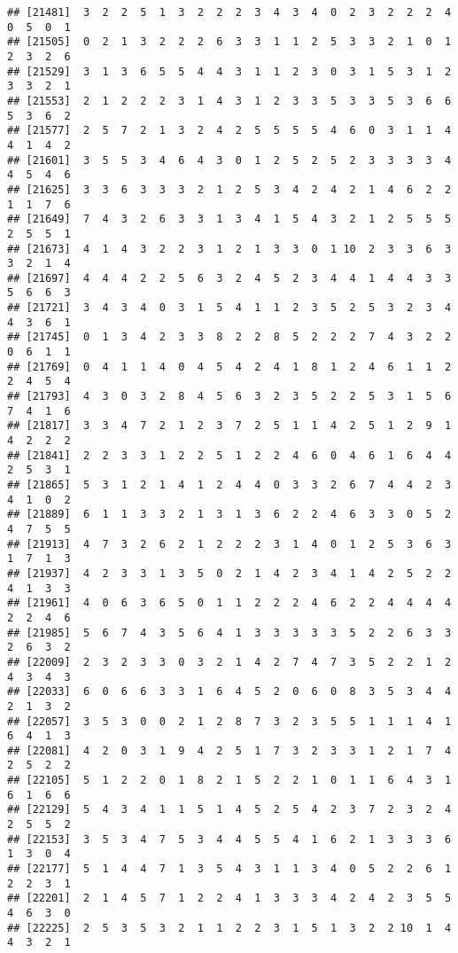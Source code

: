 \documentclass[
]{article}
\begin{document}
\begin{verbatim}
## [21481]  3  2  2  5  1  3  2  2  2  3  4  3  4  0  2  3  2  2  2  4  0  5  0  1
## [21505]  0  2  1  3  2  2  2  6  3  3  1  1  2  5  3  3  2  1  0  1  2  3  2  6
## [21529]  3  1  3  6  5  5  4  4  3  1  1  2  3  0  3  1  5  3  1  2  3  3  2  1
## [21553]  2  1  2  2  2  3  1  4  3  1  2  3  3  5  3  3  5  3  6  6  5  3  6  2
## [21577]  2  5  7  2  1  3  2  4  2  5  5  5  5  4  6  0  3  1  1  4  4  1  4  2
## [21601]  3  5  5  3  4  6  4  3  0  1  2  5  2  5  2  3  3  3  3  4  4  5  4  6
## [21625]  3  3  6  3  3  3  2  1  2  5  3  4  2  4  2  1  4  6  2  2  1  1  7  6
## [21649]  7  4  3  2  6  3  3  1  3  4  1  5  4  3  2  1  2  5  5  5  2  5  5  1
## [21673]  4  1  4  3  2  2  3  1  2  1  3  3  0  1 10  2  3  3  6  3  3  2  1  4
## [21697]  4  4  4  2  2  5  6  3  2  4  5  2  3  4  4  1  4  4  3  3  5  6  6  3
## [21721]  3  4  3  4  0  3  1  5  4  1  1  2  3  5  2  5  3  2  3  4  4  3  6  1
## [21745]  0  1  3  4  2  3  3  8  2  2  8  5  2  2  2  7  4  3  2  2  0  6  1  1
## [21769]  0  4  1  1  4  0  4  5  4  2  4  1  8  1  2  4  6  1  1  2  2  4  5  4
## [21793]  4  3  0  3  2  8  4  5  6  3  2  3  5  2  2  5  3  1  5  6  7  4  1  6
## [21817]  3  3  4  7  2  1  2  3  7  2  5  1  1  4  2  5  1  2  9  1  4  2  2  2
## [21841]  2  2  3  3  1  2  2  5  1  2  2  4  6  0  4  6  1  6  4  4  2  5  3  1
## [21865]  5  3  1  2  1  4  1  2  4  4  0  3  3  2  6  7  4  4  2  3  4  1  0  2
## [21889]  6  1  1  3  3  2  1  3  1  3  6  2  2  4  6  3  3  0  5  2  4  7  5  5
## [21913]  4  7  3  2  6  2  1  2  2  2  3  1  4  0  1  2  5  3  6  3  1  7  1  3
## [21937]  4  2  3  3  1  3  5  0  2  1  4  2  3  4  1  4  2  5  2  2  4  1  3  3
## [21961]  4  0  6  3  6  5  0  1  1  2  2  2  4  6  2  2  4  4  4  4  2  2  4  6
## [21985]  5  6  7  4  3  5  6  4  1  3  3  3  3  3  5  2  2  6  3  3  2  6  3  2
## [22009]  2  3  2  3  3  0  3  2  1  4  2  7  4  7  3  5  2  2  1  2  4  3  4  3
## [22033]  6  0  6  6  3  3  1  6  4  5  2  0  6  0  8  3  5  3  4  4  2  1  3  2
## [22057]  3  5  3  0  0  2  1  2  8  7  3  2  3  5  5  1  1  1  4  1  6  4  1  3
## [22081]  4  2  0  3  1  9  4  2  5  1  7  3  2  3  3  1  2  1  7  4  2  5  2  2
## [22105]  5  1  2  2  0  1  8  2  1  5  2  2  1  0  1  1  6  4  3  1  6  1  6  6
## [22129]  5  4  3  4  1  1  5  1  4  5  2  5  4  2  3  7  2  3  2  4  2  5  5  2
## [22153]  3  5  3  4  7  5  3  4  4  5  5  4  1  6  2  1  3  3  3  6  1  3  0  4
## [22177]  5  1  4  4  7  1  3  5  4  3  1  1  3  4  0  5  2  2  6  1  2  2  3  1
## [22201]  2  1  4  5  7  1  2  2  4  1  3  3  3  4  2  4  2  3  5  5  4  6  3  0
## [22225]  2  5  3  5  3  2  1  1  2  2  3  1  5  1  3  2  2 10  1  4  4  3  2  1

\end{verbatim}
\end{document}
